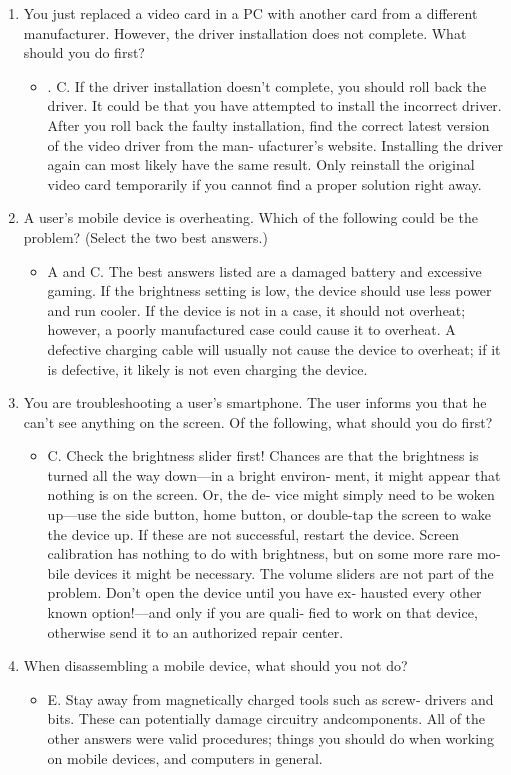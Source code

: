 \documentclass{article}
\begin{document}
\begin{enumerate}
    \item You just replaced a video card in a PC with another card from
a different manufacturer. However, the driver installation does
not complete. What should you do first?
    \begin{itemize}
        \item . C. If the driver installation doesn’t complete, you should roll
back the driver. It could be that you have attempted to install
the incorrect driver. After you roll back the faulty installation,
find the correct latest version of the video driver from the man‐
ufacturer’s website. Installing the driver again can most likely
have the same result. Only reinstall the original video card
temporarily if you cannot find a proper solution right away.
    \end{itemize}
    \item A user’s mobile device is overheating. Which of the following
could be the problem? (Select the two best answers.)
    \begin{itemize}
        \item A and C. The best answers listed are a damaged battery and
excessive gaming. If the brightness setting is low, the device
should use less power and run cooler. If the device is not in a
case, it should not overheat; however, a poorly manufactured
case could cause it to overheat. A defective charging cable will
usually not cause the device to overheat; if it is defective, it
likely is not even charging the device.
    \end{itemize}
    \item You are troubleshooting a user’s smartphone. The user informs
you that he can’t see anything on the screen. Of the following,
what should you do first?
    \begin{itemize}
        \item C. Check the brightness slider first! Chances are that the
brightness is turned all the way down—in a bright environ‐
ment, it might appear that nothing is on the screen. Or, the de‐
vice might simply need to be woken up—use the side button,
home button, or double-tap the screen to wake the device up. If
these are not successful, restart the device. Screen calibration
has nothing to do with brightness, but on some more rare mo‐
bile devices it might be necessary. The volume sliders are not
part of the problem. Don’t open the device until you have ex‐
hausted every other known option!—and only if you are quali‐
fied to work on that device, otherwise send it to an authorized
repair center.
    \end{itemize}
    \item When disassembling a mobile device, what should you not do?
    \begin{itemize}
        \item E. Stay away from magnetically charged tools such as screw‐
drivers and bits. These can potentially damage circuitry andcomponents. All of the other answers were valid procedures;
things you should do when working on mobile devices, and
computers in general.
    \end{itemize}
\end{enumerate}
\end{document}
